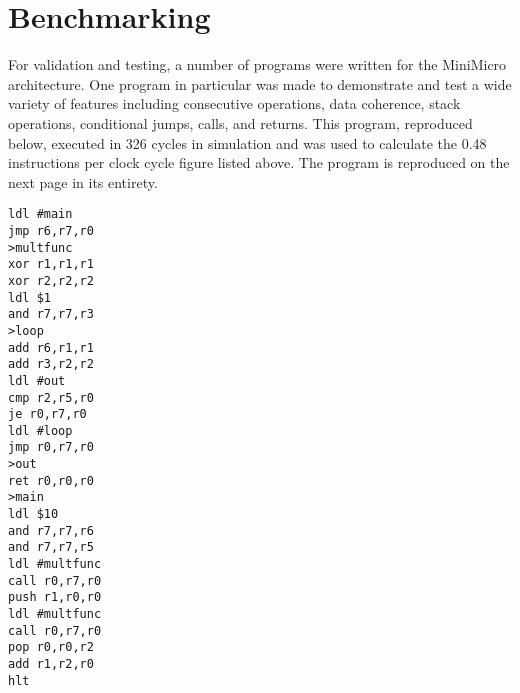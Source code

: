 \documentclass[12pt,letterpaper]{article}
\begin{document}
\section{Benchmarking}
For validation and testing, a number of programs were written for the MiniMicro architecture. One program in particular was made to demonstrate and test a wide variety of features including consecutive operations, data coherence, stack operations, conditional jumps, calls, and returns. This program, reproduced below, executed in 326 cycles in simulation and was used to calculate the 0.48 instructions per clock cycle figure listed above. The program is reproduced on the next page in its entirety. 

\newpage

\lstset{numbers=left, frame=shadowbox}
\begin{lstlisting}
ldl #main
jmp r6,r7,r0
>multfunc
xor r1,r1,r1
xor r2,r2,r2
ldl $1
and r7,r7,r3
>loop
add r6,r1,r1
add r3,r2,r2
ldl #out
cmp r2,r5,r0
je r0,r7,r0
ldl #loop
jmp r0,r7,r0
>out
ret r0,r0,r0
>main
ldl $10
and r7,r7,r6
and r7,r7,r5
ldl #multfunc
call r0,r7,r0
push r1,r0,r0
ldl #multfunc
call r0,r7,r0
pop r0,r0,r2
add r1,r2,r0
hlt
\end{lstlisting}
\end{document}
